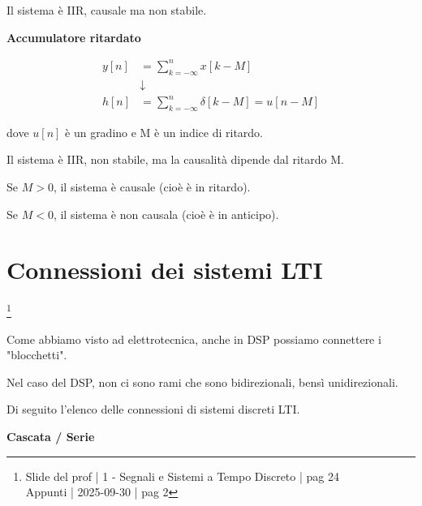 Il sistema è IIR, causale ma non stabile. \newline 

\textbf{Accumulatore ritardato} \newline 

{
    \Large 
    \begin{equation}
        \begin{split}
        y \left[ n\right]
        &= 
        \sum_{k = - \infty}^{n}
        x \left[ k - M\right]
       \\
       &\downarrow
       \\
       h \left[ n\right]
       &= 
        \sum_{k = - \infty}^{n} 
        \delta \left[ k - M \right]
        = 
        u \left[ n - M\right]
    \end{split}
    \end{equation}
}

dove $u \left[ n\right]$ è un gradino e M è un indice di ritardo. \newline 

Il sistema è IIR, non stabile, ma la causalità dipende dal ritardo M. \newline 

Se $M > 0$, il sistema è causale (cioè è in ritardo). \newline  

Se $M < 0$, il sistema è non causala (cioè è in anticipo). \newline 

\newpage 

\section{Connessioni dei sistemi LTI}

\footnote{ 
    Slide del prof | 1 - Segnali e Sistemi a Tempo Discreto | pag 24\\
    Appunti | 2025-09-30 | pag 2 
}

Come abbiamo visto ad elettrotecnica, anche in DSP possiamo connettere i "blocchetti". \newline 

Nel caso del DSP, non ci sono rami che sono bidirezionali, bensì unidirezionali. \newline 

Di seguito l'elenco delle connessioni di sistemi discreti LTI. \newline 

\textbf{Cascata / Serie} \newline

